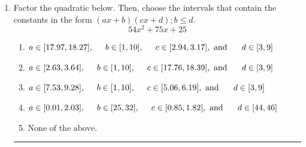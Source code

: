 \documentclass[14pt]{extbook}
\newcommand{\litem}[1]{\item#1\hspace*{-1cm}\rule{\textwidth}{0.4pt}}
\begin{document}
\begin{enumerate}
\litem{
Factor the quadratic below. Then, choose the intervals that contain the constants in the form $(ax+b)(cx+d); b \leq d.$\[ 54x^{2} +75 x + 25 \]\begin{enumerate}[label=\Alph*.]
\item \( a \in [17.97, 18.27], \hspace*{5mm} b \in [1, 10], \hspace*{5mm} c \in [2.94, 3.17], \text{ and } \hspace*{5mm} d \in [3, 9] \)
\item \( a \in [2.63, 3.64], \hspace*{5mm} b \in [1, 10], \hspace*{5mm} c \in [17.76, 18.39], \text{ and } \hspace*{5mm} d \in [3, 9] \)
\item \( a \in [7.53, 9.28], \hspace*{5mm} b \in [1, 10], \hspace*{5mm} c \in [5.06, 6.19], \text{ and } \hspace*{5mm} d \in [3, 9] \)
\item \( a \in [0.01, 2.03], \hspace*{5mm} b \in [25, 32], \hspace*{5mm} c \in [0.85, 1.82], \text{ and } \hspace*{5mm} d \in [44, 46] \)
\item \( \text{None of the above.} \)


\end{enumerate}}
\end{enumerate}
\end{document}
